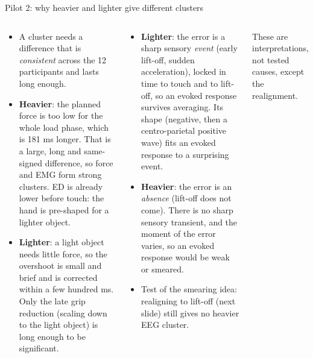 \documentclass[aspectratio=169,10pt]{beamer}
\begin{document}
\begin{frame}{Pilot 2: why heavier and lighter give different clusters}
  \begin{columns}[T]
    \begin{tcolorbox}[stagebox,title={Why the body clusters differ}]
      \scriptsize
      \begin{itemize}
        \item A cluster needs a difference that is \emph{consistent} across the 12 participants and lasts long enough.
        \item \textbf{Heavier}: the planned force is too low for the whole load phase, which is 181 ms longer. That is
              a large, long and same-signed difference, so force and EMG form strong clusters. ED is already lower
              before touch: the hand is pre-shaped for a lighter object.
        \item \textbf{Lighter}: a light object needs little force, so the overshoot is small and brief and is
              corrected within a few hundred ms. Only the late grip reduction (scaling down to the light object) is
              long enough to be significant.
      \end{itemize}
    \end{tcolorbox}
    \begin{tcolorbox}[stagebox,title={Why the EEG clusters differ}]
      \scriptsize
      \begin{itemize}
        \item \textbf{Lighter}: the error is a sharp sensory \emph{event} (early lift-off, sudden acceleration),
              locked in time to touch and to lift-off, so an evoked response survives averaging. Its shape (negative,
              then a centro-parietal positive wave) fits an evoked response to a surprising event.
        \item \textbf{Heavier}: the error is an \emph{absence} (lift-off does not come). There is no sharp sensory
              transient, and the moment of the error varies, so an evoked response would be weak or smeared.
        \item Test of the smearing idea: realigning to lift-off (next slide) still gives no heavier EEG cluster.
      \end{itemize}
    \end{tcolorbox}
    {\scriptsize These are interpretations, not tested causes, except the realignment.\par}
  \end{columns}
\end{frame}
\end{document}
